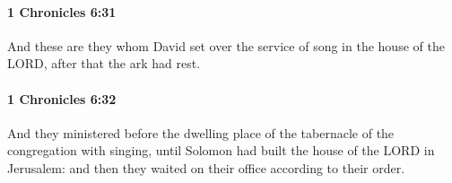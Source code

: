 		\paragraph{1 Chronicles 6:31} %
			\label{1CHRONICLES-6-31}

			And these are they whom David set over the service of song in the house of the LORD, after that the ark had rest.


		\paragraph{1 Chronicles 6:32} %
			\label{1CHRONICLES-6-32}

			And they ministered before the dwelling place of the tabernacle of the congregation with singing, until Solomon had built the house of the LORD in Jerusalem: and then they waited on their office according to their order.


